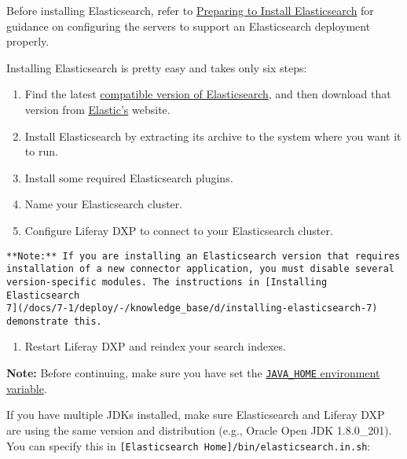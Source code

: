 Before installing Elasticsearch, refer to
\href{/docs/7-1/deploy/-/knowledge_base/d/preparing-to-install-elasticsearch}{Preparing
to Install Elasticsearch} for guidance on configuring the servers to
support an Elasticsearch deployment properly.

Installing Elasticsearch is pretty easy and takes only six steps:

\begin{enumerate}
\def\labelenumi{\arabic{enumi}.}
\item
  Find the latest
  \href{https://help.liferay.com/hc/en-us/articles/360016511651\#Liferay-DXP-7.1}{compatible
  version of Elasticsearch}, and then download that version from
  \href{https://www.elastic.co}{Elastic's} website.
\item
  Install Elasticsearch by extracting its archive to the system where
  you want it to run.
\item
  Install some required Elasticsearch plugins.
\item
  Name your Elasticsearch cluster.
\item
  Configure Liferay DXP to connect to your Elasticsearch cluster.
\end{enumerate}

\noindent\hrulefill

\begin{verbatim}
**Note:** If you are installing an Elasticsearch version that requires
installation of a new connector application, you must disable several
version-specific modules. The instructions in [Installing Elasticsearch
7](/docs/7-1/deploy/-/knowledge_base/d/installing-elasticsearch-7)
demonstrate this.
\end{verbatim}

\noindent\hrulefill

\begin{enumerate}
\def\labelenumi{\arabic{enumi}.}
\setcounter{enumi}{5}
\tightlist
\item
  Restart Liferay DXP and reindex your search indexes.
\end{enumerate}

\noindent\hrulefill

\textbf{Note:} Before continuing, make sure you have set the
\href{https://docs.oracle.com/cd/E19182-01/820-7851/inst_cli_jdk_javahome_t/}{\texttt{JAVA\_HOME}
environment variable}.

If you have multiple JDKs installed, make sure Elasticsearch and Liferay
DXP are using the same version and distribution (e.g., Oracle Open JDK
1.8.0\_201). You can specify this in
\texttt{{[}Elasticsearch\ Home{]}/bin/elasticsearch.in.sh}:

